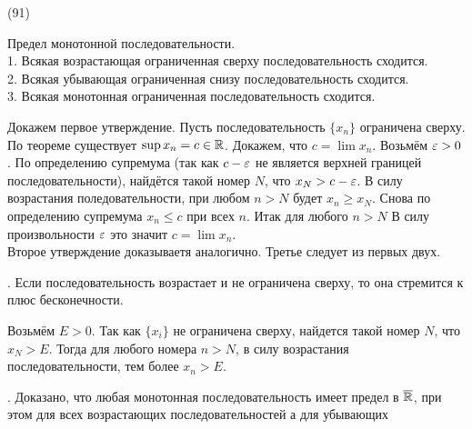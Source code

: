 (91)

\T \q Предел монотонной последовательности.\\
1. Всякая возрастающая ограниченная сверху последовательность сходится.\\
2. Всякая убывающая ограниченная снизу последовательность сходится.\\
3. Всякая монотонная ограниченная последовательность сходится.

\D Докажем первое утверждение. Пусть последовательность $\{x_n\}$ ограничена сверху. По теореме существует $\sup x_n = c \in \mathbb{R}$. Докажем, что $c = \lim x_n$. Возьмём $\varepsilon > 0$. По определению супремума (так как $c - \varepsilon$ не является верхней границей последовательности), найдётся такой номер $N$, что $x_N > c - \varepsilon$. В силу возрастания поледовательности, при любом $n > N$ будет $x_n \ge x_N$. Снова по определению супремума $x_n \le c$ при всех $n$. Итак для любого $n > N$ В силу произвольности $\varepsilon$ это значит $c = \lim x_n$.\\
Второе утверждение доказываетя аналогично. Третье следует из первых двух.

. Если последовательность возрастает и не ограничена сверху, то она стремится к плюс бесконечности.

\D Возьмём $E > 0$. Так как $\{x_i\}$ не ограничена сверху, найдется такой номер $N$, что $x_N > E$. Тогда для любого номера $n > N$, в силу возрастания последовательности, тем более $x_n > E$.

. Доказано, что любая монотонная последовательность имеет предел в $\overline{\mathbb{R}}$, при этом для всех возрастающих последовательностей  а для убывающих 